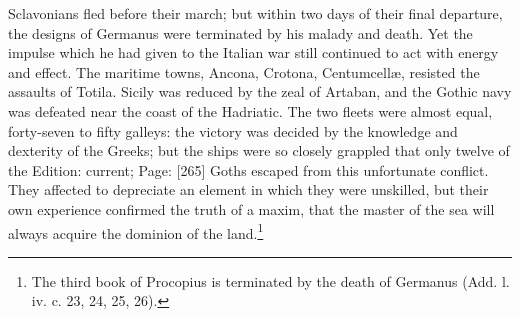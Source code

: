 Sclavonians fled before their march; but within two days of their final departure, the designs of Germanus were terminated by his malady and death. Yet the impulse which he had given to the Italian war still continued to act with energy and effect. The maritime towns, Ancona, Crotona, Centumcellæ, resisted the assaults of Totila. Sicily was reduced by the zeal of Artaban, and the Gothic navy was defeated near the coast of the Hadriatic. The two fleets were almost equal, forty-seven to fifty galleys: the victory was decided by the knowledge and dexterity of the Greeks; but the ships were so closely grappled that only twelve of the Edition: current; Page: [265] Goths escaped from this unfortunate conflict. They affected to depreciate an element in which they were unskilled, but their own experience confirmed the truth of a maxim, that the master of the sea will always acquire the dominion of the land.\footnote{The third book of Procopius is terminated by the death of Germanus (Add. l. iv. c. 23, 24, 25, 26).}

